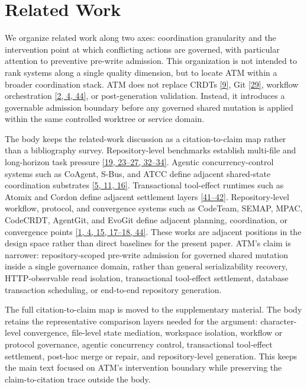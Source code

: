 \documentclass[9pt,letterpaper]{extarticle}
\begin{document}
\section{Related Work}

We organize related work along two axes: coordination granularity and the intervention point at which conflicting actions are governed, with particular attention to preventive pre-write admission. This organization is not intended to rank systems along a single quality dimension, but to locate ATM within a broader coordination stack. ATM does not replace CRDTs \textcolor{atmLinkBlue}{\hyperlink{Item.45}{[9]}}, Git \textcolor{atmLinkBlue}{\hyperlink{Item.65}{[29]}}, workflow orchestration \textcolor{atmLinkBlue}{\hyperlink{Item.38}{[2, 4, 44]}}, or post-generation validation. Instead, it introduces a governable admission boundary before any governed shared mutation is applied within the same controlled worktree or service domain.

The body keeps the related-work discussion as a citation-to-claim map rather than a bibliography survey. Repository-level benchmarks establish multi-file and long-horizon task pressure \textcolor{atmLinkBlue}{\hyperlink{Item.55}{[19, 23--27, 32--34]}}. Agentic concurrency-control systems such as CoAgent, S-Bus, and ATCC define adjacent shared-state coordination substrates \textcolor{atmLinkBlue}{\hyperlink{Item.41}{[5, 11, 16]}}. Transactional tool-effect runtimes such as Atomix and Cordon define adjacent settlement layers \textcolor{atmLinkBlue}{\hyperlink{Item.77}{[41--42]}}. Repository-level workflow, protocol, and convergence systems such as CodeTeam, SEMAP, MPAC, CodeCRDT, AgentGit, and EvoGit define adjacent planning, coordination, or convergence points \textcolor{atmLinkBlue}{\hyperlink{Item.37}{[1, 4, 15, 17--18, 44]}}. These works are adjacent positions in the design space rather than direct baselines for the present paper. ATM's claim is narrower: repository-scoped pre-write admission for governed shared mutation inside a single governance domain, rather than general serializability recovery, HTTP-observable read isolation, transactional tool-effect settlement, database transaction scheduling, or end-to-end repository generation.

The full citation-to-claim map is moved to the supplementary material. The body retains the representative comparison layers needed for the argument: character-level convergence, file-level state mediation, workspace isolation, workflow or protocol governance, agentic concurrency control, transactional tool-effect settlement, post-hoc merge or repair, and repository-level generation. This keeps the main text focused on ATM's intervention boundary while preserving the claim-to-citation trace outside the body.
\end{document}

